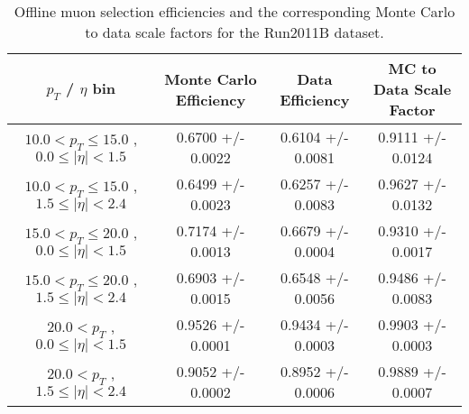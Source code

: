  \begin{table}[!ht]
 \begin{center} 
 \begin{tabular}{|c|c|c|c|}
 \hline
 $p_{T}$ / $\eta$ bin    &  Monte Carlo Efficiency    &  Data Efficiency   &  MC to Data Scale Factor \\   \hline           
$ 10.0 < p_{T} \le  15.0$ , $  0.0  \le |\eta| <   1.5$   &       0.6700 +/- 0.0022   &       0.6104 +/- 0.0081   &       0.9111 +/- 0.0124   \\   
\hline
$ 10.0 < p_{T} \le  15.0$ , $  1.5  \le |\eta| <   2.4$   &       0.6499 +/- 0.0023   &       0.6257 +/- 0.0083   &       0.9627 +/- 0.0132   \\   
\hline
$ 15.0 < p_{T} \le  20.0$ , $  0.0  \le |\eta| <   1.5$   &       0.7174 +/- 0.0013   &       0.6679 +/- 0.0004   &       0.9310 +/- 0.0017   \\   
\hline
$ 15.0 < p_{T} \le  20.0$ , $  1.5  \le |\eta| <   2.4$   &       0.6903 +/- 0.0015   &       0.6548 +/- 0.0056   &       0.9486 +/- 0.0083   \\   
\hline
$ 20.0 < p_{T} $ , $  0.0  \le |\eta| <   1.5$   &       0.9526 +/- 0.0001   &       0.9434 +/- 0.0003   &       0.9903 +/- 0.0003   \\   
\hline
$ 20.0 < p_{T} $ , $  1.5  \le |\eta| <   2.4$   &       0.9052 +/- 0.0002   &       0.8952 +/- 0.0006   &       0.9889 +/- 0.0007   \\   
\hline
\end{tabular}
\caption{Offline muon selection efficiencies and the corresponding Monte Carlo to data scale factors for the
Run2011B dataset.}
\label{tab:eff_mu_offline_Run2011B}
\end{center}
\end{table}


